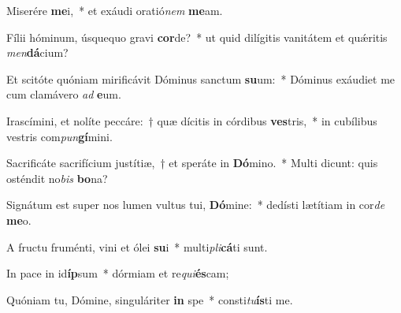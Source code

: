 \item Miserére \textbf{me}i,~* et exáudi oratió\textit{nem} \textbf{me}am.
\item Fílii hóminum, úsquequo gravi \textbf{cor}de?~* ut quid dilígitis vanitátem et quǽritis \textit{men}\textbf{dá}cium?
\item Et scitóte quóniam mirificávit Dóminus sanctum \textbf{su}um:~* Dóminus exáudiet me cum clamávero \textit{ad} \textbf{e}um.
\item Irascímini, et nolíte peccáre:~† quæ dícitis in córdibus \textbf{ves}tris,~* in cubílibus vestris com\textit{pun}\textbf{gí}mini.
\item Sacrificáte sacrifícium justítiæ,~† et speráte in \textbf{Dó}mino.~* Multi dicunt: quis osténdit no\textit{bis} \textbf{bo}na?
\item Signátum est super nos lumen vultus tui, \textbf{Dó}mine:~* dedísti lætítiam in cor\textit{de} \textbf{me}o.
\item A fructu fruménti, vini et ólei \textbf{su}i~* multi\textit{pli}\textbf{cá}ti sunt.
\item In pace in id\textbf{íp}sum~* dórmiam et re\textit{qui}\textbf{és}cam;
\item Quóniam tu, Dómine, singuláriter \textbf{in} spe~* consti\textit{tu}\textbf{ís}ti me.
